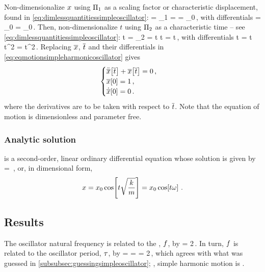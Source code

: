 Non-dimensionalize $x$ using $\Pi_1$ as a scaling factor or characteristic displacement, found in \cref{eq:dimlessquantitiessimpleoscillator}:
\beq
\scpq\odisp = \kdim_1 = \implies
\odisp = \odisp_0\scpq\odisp\,,
\eeq
with differentials
\beq
   \dx\odisp = \odisp_0\dx\scpq\odisp\qquad{}\qquad
{}\odisp = \odisp_0\scpq\odisp\,.
\eeq
Then, non-dimensionalize $t$ using $\Pi_2$ as a characteristic time -- see \cref{eq:dimlessquantitiessimpleoscillator}:
\beq
\scpq t = \kdim_2 = t\sqrt{\dfrac{\kspring}{\mass}}\implies
t = \scpq t\sqrt{\dfrac{\mass}{\kspring}}\,,
\eeq
with differentials
\beq
\dx t = \dx\scpq t\sqrt{\dfrac{\mass}{\kspring}}\qquad{}\qquad
\dx t^2 = \dx\scpq t^2\dfrac{\mass}{\kspring}\,.
\eeq
Replacing $\overline{x}$, $\overline{t}$ and their differentials in \cref{eq:eqmotionsimpleharmonicoscillator} gives
\begin{equation}\label{eq:dimlessequationmotionsimpleoscillator}
\begin{cases}
\ddot{\overline{x}}\!\left[{\overline{t}}\right] + \overline{x}\!\left[{\overline{t}}\right] = 0\,, \\
\overline{x}\!\left[{0}\right] = 1\,,\\
\dot{\overline{x}}\!\left[{0}\right] = 0\,.
\end{cases}
\end{equation}
where the derivatives are to be taken with respect to $\overline{t}$. Note that the equation of motion is dimensionless and parameter free.


\subsubsection{Analytic solution}
 is a second-order, linear ordinary differential equation  whose solution is given by
\beq
\scpq\odisp = \cos{}\,,
\eeq
or, in dimensional form,
\begin{equation}\label{eq:solsimpleharmonicmotion}
x = x_0\cos\!\left[{t\sqrt{\dfrac{k}{m}}}\right]
       = x_0\cos\!\left[{t\omega}\right]\,.
\end{equation}


\subsection{Results}
The oscillator natural frequency is related to the , $f$, by
\beq
\natfreq = 2\pi\cycfreq\,.
\eeq
In turn, $f$ is related to the oscillator period, $\tau$, by
\beq
\oper =  \implies
\oper = \dfrac{2\pi}{\natfreq} 
      = 2\pi\sqrt{\dfrac{\mass}{\kspring}}\,,
\eeq
which agrees with what was guessed in \cref{subsubsec:guessingsimpleoscillator}; \ie, simple harmonic motion is .

